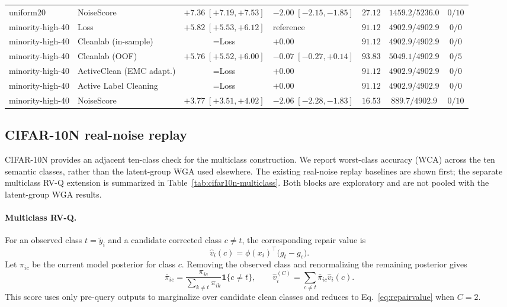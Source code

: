 \documentclass{article}
\begin{document}
\begin{table}[H]
{\begin{tabular}{llclccc}
uniform20 & NoiseScore & $+7.36\;[+7.19,+7.53]$ & $-2.00\;[-2.15,-1.85]$ & $27.12$ & $1459.2/5236.0$ & $0/10$ \\
minority-high-40 & Loss & $+5.82\;[+5.53,+6.12]$ & reference & $91.12$ & $4902.9/4902.9$ & $0/0$ \\
minority-high-40 & Cleanlab (in-sample) & =Loss & $+0.00$ & $91.12$ & $4902.9/4902.9$ & $0/0$ \\
minority-high-40 & Cleanlab (OOF) & $+5.76\;[+5.52,+6.00]$ & $-0.07\;[-0.27,+0.14]$ & $93.83$ & $5049.1/4902.9$ & $0/5$ \\
minority-high-40 & ActiveClean (EMC adapt.) & =Loss & $+0.00$ & $91.12$ & $4902.9/4902.9$ & $0/0$ \\
minority-high-40 & Active Label Cleaning & =Loss & $+0.00$ & $91.12$ & $4902.9/4902.9$ & $0/0$ \\
minority-high-40 & NoiseScore & $+3.77\;[+3.51,+4.02]$ & $-2.06\;[-2.28,-1.83]$ & $16.53$ & $889.7/4902.9$ & $0/10$ \\
\bottomrule
\end{tabular}}
\end{table}

\subsection{CIFAR-10N real-noise replay}
\label{app:cifar10n}
CIFAR-10N provides an adjacent ten-class check for the multiclass construction. We report worst-class accuracy (WCA) across the ten semantic classes, rather than the latent-group WGA used elsewhere. The existing real-noise replay baselines are shown first; the separate multiclass RV-Q extension is summarized in Table~\ref{tab:cifar10n-multiclass}. Both blocks are exploratory and are not pooled with the latent-group WGA results.

\paragraph{Multiclass RV-Q.}
For an observed class $t=\tilde y_i$ and a candidate corrected class $c\ne t$,
the corresponding repair value is
\begin{equation}
  \hat v_i(c)=\phi(x_i)^\top\big(g_t-g_c\big).
\end{equation}
Let $\pi_{ic}$ be the current model posterior for class $c$. Removing the
observed class and renormalizing the remaining posterior gives
\begin{equation}
  \bar\pi_{ic}=\frac{\pi_{ic}}{\sum_{k\ne t}\pi_{ik}}\mathbf 1\{c\ne t\},
  \qquad
  \hat v_i^{(C)}=\sum_{c\ne t}\bar\pi_{ic}\hat v_i(c).
  \label{eq:repairvalue-multiclass}
\end{equation}
This score uses only pre-query outputs to marginalize over candidate clean
classes and reduces to Eq.~\ref{eq:repairvalue} when $C=2$.
\end{document}
